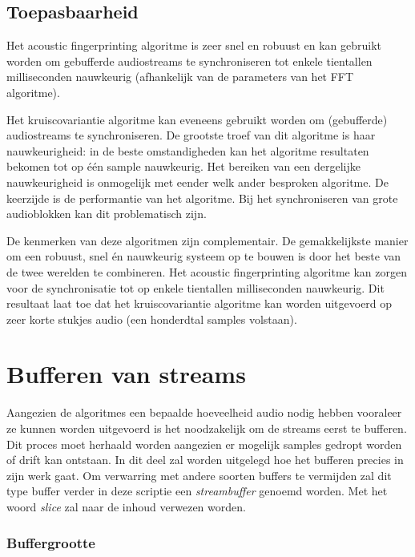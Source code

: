 \subsection{Toepasbaarheid}
\label{toepasbaarheid}

Het acoustic fingerprinting algoritme is zeer snel en robuust en kan gebruikt worden om gebufferde audiostreams te synchroniseren tot enkele tientallen milliseconden nauwkeurig (afhankelijk van de parameters van het FFT algoritme).

Het kruiscovariantie algoritme kan eveneens gebruikt worden om (gebufferde) audiostreams te synchroniseren. De grootste troef van dit algoritme is haar nauwkeurigheid: in de beste omstandigheden kan het algoritme resultaten bekomen tot op één sample nauwkeurig. Het bereiken van een dergelijke nauwkeurigheid is onmogelijk met eender welk ander besproken algoritme. De keerzijde is de performantie van het algoritme. Bij het synchroniseren van grote audioblokken kan dit problematisch zijn.

De kenmerken van deze algoritmen zijn complementair. De gemakkelijkste manier om een robuust, snel én nauwkeurig systeem op te bouwen is door het beste van de twee werelden te combineren. Het acoustic fingerprinting algoritme kan zorgen voor de synchronisatie tot op enkele tientallen milliseconden nauwkeurig. Dit resultaat laat toe dat het kruiscovariantie algoritme kan worden uitgevoerd op zeer korte stukjes audio (een honderdtal samples volstaan).

\section{Bufferen van streams}
\label{streambuffers}

Aangezien de algoritmes een bepaalde hoeveelheid audio nodig hebben vooraleer ze kunnen worden uitgevoerd is het noodzakelijk om de streams eerst te bufferen. Dit proces moet herhaald worden aangezien er mogelijk samples gedropt worden of drift kan ontstaan. In dit deel zal worden uitgelegd hoe het bufferen precies in zijn werk gaat. Om verwarring met andere soorten buffers te vermijden zal dit type buffer verder in deze scriptie een \textit{streambuffer} genoemd worden. Met het woord \textit{slice} zal naar de inhoud verwezen worden.

\subsubsection{Buffergrootte}

